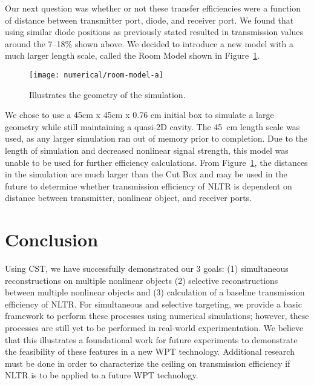 Our next question was whether or not these transfer efficiencies were a function of distance between transmitter port, diode, and receiver port. We found that using similar diode positions as previously stated resulted in transmission values around the \numrange{7}{18}\% shown above. We decided to introduce a new model with a much larger length scale, called the Room Model shown in Figure~\ref{fig:numerical-room-model}.

\begin{figure}[h]
\centering
\texttt{[image: numerical/room-model-a]}
\caption[Geometry of the Room Model]{Illustrates the geometry of the simulation.}
\label{fig:numerical-room-model}
\end{figure}


We chose to use a 45cm x 45cm x 0.76 cm initial box to simulate a large geometry while still maintaining a quasi-2D cavity. The 45~cm length scale was used, as any larger simulation ran out of memory prior to completion.  Due to the length of simulation and decreased nonlinear signal strength, this model was unable to be used for further efficiency calculations. From Figure~\ref{fig:numerical-room-model}, the distances in the simulation are much larger than the Cut Box and may be used in the future to determine whether transmission efficiency of NLTR is dependent on distance between transmitter, nonlinear object, and receiver ports.

\section{Conclusion}
\label{sec:numerical-conclusion}

Using CST, we have successfully demonstrated our 3 goals: (1) simultaneous reconstructions on multiple nonlinear objects (2) selective reconstructions between multiple nonlinear objects and (3) calculation of a baseline transmission efficiency of NLTR. For simultaneous and selective targeting, we provide a basic framework to perform these processes using numerical simulations; however, these processes are still yet to be performed in real-world experimentation. We believe that this illustrates a foundational work for future experiments to demonstrate the feasibility of these features in a new WPT technology. Additional research must be done in order to characterize the ceiling on transmission efficiency if NLTR is to be applied to a future WPT technology.
